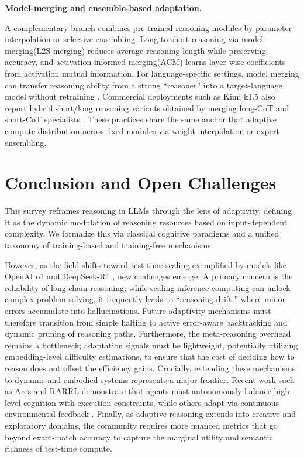 \documentclass[11pt]{article}
\begin{document}
\textbf{Model-merging and ensemble-based adaptation.}


A complementary branch combines pre-trained reasoning modules by parameter interpolation or selective ensembling.
Long-to-short reasoning via model merging(L2S merging) \citep{Wu2025L2S} reduces average reasoning length while preserving accuracy, and
activation-informed merging(ACM)\citep{Yao2025ACM} learns layer-wise coefficients from activation mutual information.
For language-specific settings, model merging can transfer reasoning ability from a strong “reasoner” into a target-language model without retraining \citep{Pipatanakul2025LangSpecificMerge}.
Commercial deployments such as Kimi k1.5 also report hybrid short/long reasoning variants obtained by merging long-CoT and short-CoT specialists \citep{TeamKimi2025Kimi15}.
These practices share the same anchor that {adaptive compute distribution across fixed modules} via weight interpolation or expert ensembling.
\section{Conclusion and Open Challenges}
This survey reframes reasoning in LLMs through the lens of adaptivity, defining it as the dynamic modulation of reasoning resources based on input-dependent complexity. We formalize this via classical cognitive paradigms and a unified taxonomy of training-based and training-free mechanisms. 

However, as the field shifts toward test-time scaling exemplified by models like OpenAI o1 \cite{jaech2024openai} and DeepSeek-R1 \cite{guo2025deepseek}, new challenges emerge. A primary concern is the reliability of long-chain reasoning; while scaling inference computing can unlock complex problem-solving, it frequently leads to ``reasoning drift,'' where minor errors accumulate into hallucinations. Future adaptivity mechanisms must therefore transition from simple halting to active error-aware backtracking and dynamic pruning of reasoning paths. Furthermore, the meta-reasoning overhead remains a bottleneck; adaptation signals must be lightweight, potentially utilizing embedding-level difficulty estimations, to ensure that the cost of deciding {how} to reason does not offset the efficiency gains. Crucially, extending these mechanisms to dynamic and embodied systems represents a major frontier. Recent work such as Ares \cite{yang2026ares} and RARRL \cite{liu2026should} demonstrate that agents must autonomously balance high-level cognition with execution constraints, while others adapt via continuous environmental feedback \cite{kurokitime}. Finally, as adaptive reasoning extends into creative and exploratory domains, the community requires more nuanced metrics that go beyond exact-match accuracy to capture the marginal utility and semantic richness of test-time compute.
\end{document}
